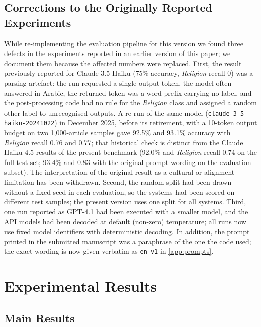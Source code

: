 \documentclass[preprint,12pt,authoryear]{elsarticle}
\newif\ifrevmarkup
\DeclareRobustCommand{\rev}[1]{\ifrevmarkup{\color{blue}#1}\else#1\fi}
\begin{document}
\subsection{\rev{Corrections to the Originally Reported Experiments}}
\label{corrections}

\rev{While re-implementing the evaluation pipeline for this version we found three defects in the experiments reported in an earlier version of this paper; we document them because the affected numbers were replaced. First, the result previously reported for Claude 3.5 Haiku (75\% accuracy, \textit{Religion} recall 0) was a parsing artefact: the run requested a single output token, the model often answered in Arabic, the returned token was a word prefix carrying no label, and the post-processing code had no rule for the \textit{Religion} class and assigned a random other label to unrecognised outputs. A re-run of the same model (\texttt{claude-3-5-haiku-20241022}) in December 2025, before its retirement, with a 10-token output budget on two 1,000-article samples gave 92.5\% and 93.1\% accuracy with \textit{Religion} recall 0.76 and 0.77; that historical check is distinct from the Claude Haiku 4.5 results of the present benchmark (92.0\% and \textit{Religion} recall 0.74 on the full test set; 93.4\% and 0.83 with the original prompt wording on the evaluation subset). The interpretation of the original result as a cultural or alignment limitation has been withdrawn. Second, the random split had been drawn without a fixed seed in each evaluation, so the systems had been scored on different test samples; the present version uses one split for all systems. Third, one run reported as GPT-4.1 had been executed with a smaller model, and the API models had been decoded at default (non-zero) temperature; all runs now use fixed model identifiers with deterministic decoding. In addition, the prompt printed in the submitted manuscript was a paraphrase of the one the code used; the exact wording is now given verbatim as \texttt{en\_v1} in \ref{app:prompts}.}

\section{Experimental Results}
\label{results}

\subsection{Main Results}
\label{sec:main}
\end{document}
